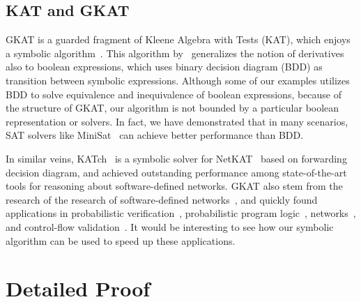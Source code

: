 \documentclass[conference]{IEEEtran}
\begin{document}
\subsection{KAT and GKAT}

GKAT is a guarded fragment of Kleene Algebra with Tests (KAT), which enjoys a symbolic algorithm~\cite{pous_SymbolicAlgorithmsLanguage_2015}.
This algorithm by~\citeauthor{pous_SymbolicAlgorithmsLanguage_2015} generalizes the notion of derivatives also to boolean expressions, which uses binary decision diagram (BDD) as transition between symbolic expressions.
Although some of our examples utilizes BDD to solve equivalence and inequivalence of boolean expressions, because of the structure of GKAT, our algorithm is not bounded by a particular boolean representation or solvers.
In fact, we have demonstrated that in many scenarios, SAT solvers like MiniSat~\cite{een_MINISAT_2004} can achieve better performance than BDD.

In similar veins, KATch~\cite{moeller_KATchFastSymbolic_2024} is a symbolic solver for NetKAT~\cite{anderson_NetKATSemanticFoundations_2014} based on forwarding decision diagram, and achieved outstanding performance among state-of-the-art tools for reasoning about software-defined networks.
GKAT also stem from the research of the research of software-defined networks~\cite{smolka_ScalableVerificationProbabilistic_2019,smolka_GuardedKleeneAlgebra_2020}, and quickly found applications in probabilistic verification~\cite{ro.zowski_ProbabilisticGuardedKAT_2023}, probabilistic program logic~\cite{gomes_KleeneAlgebraTests_2024}, networks~\cite{wasserstein_GUARDEDNETKATSOUNDNESS_2023}, and control-flow validation~\cite{zhang_CFGKATEfficientValidation_2025}.
It would be interesting to see how our symbolic algorithm can be used to speed up these applications.

\printbibliography

\clearpage
\appendix

\section{Detailed Proof}
\printProofs
\end{document}
